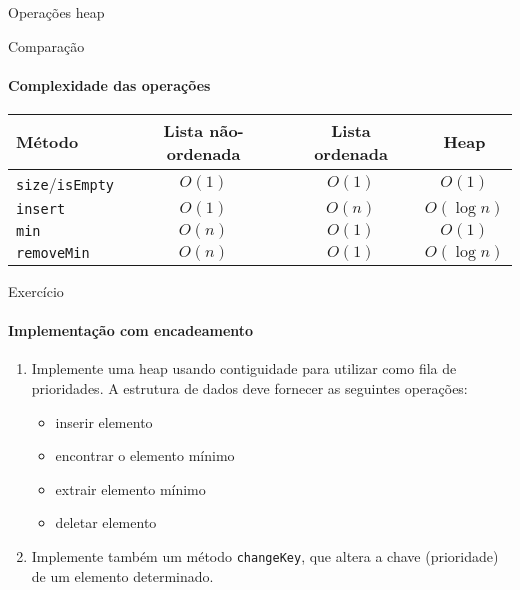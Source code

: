 \begin{frame}{Operações heap}

\end{frame}



\begin{frame}{Comparação}
\framesubtitle{Complexidade das operações}

\begin{table}
	\centering
	\begin{tabular}{lccc}
		\hline
		\textbf{Método} & \textbf{Lista não-ordenada} & \textbf{Lista ordenada} & \textbf{Heap} \\
		\hline
		\texttt{size}/\texttt{isEmpty} & $O(1)$ & $O(1)$ & $O(1)$ \\
		\texttt{insert} & $O(1)$ & $O(n)$ & $O(\log n)$ \\
		\texttt{min} & $O(n)$ & $O(1)$ & $O(1)$ \\
		\texttt{removeMin} & $O(n)$ & $O(1)$ & $O(\log n)$ \\
		\hline
	\end{tabular}
\end{table}

\end{frame}


\begin{frame}{Exercício}
\framesubtitle{Implementação com encadeamento}
\begin{enumerate}
	\item Implemente uma heap usando contiguidade para utilizar como fila de prioridades. A estrutura de dados deve fornecer as seguintes operações:
	
	\begin{itemize}
		\item inserir elemento
		\item encontrar o elemento mínimo
		\item extrair elemento mínimo
		\item deletar elemento
	\end{itemize}

	\item Implemente também um método \texttt{changeKey}, que altera a chave (prioridade) de um elemento determinado.
\end{enumerate}
\end{frame}

%	


